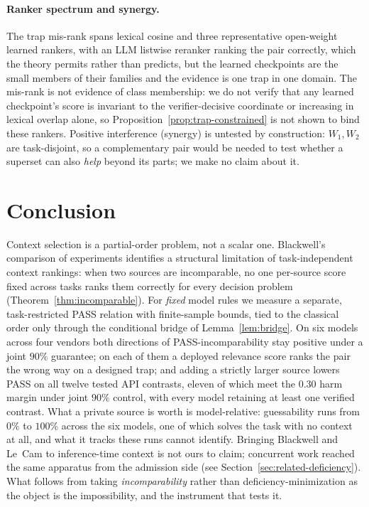 \documentclass[11pt]{article}
\theoremstyle{plain}
\theoremstyle{definition}
\theoremstyle{remark}
\begin{document}
\paragraph{Ranker spectrum and synergy.} The trap mis-rank spans lexical cosine and three
representative open-weight learned rankers, with an LLM listwise reranker ranking the pair
correctly, which the theory permits rather than predicts, but the
learned checkpoints are the small members of their families and the evidence is one trap in one
domain. The mis-rank is not evidence of class membership: we do not verify that any learned
checkpoint's score is invariant to the verifier-decisive coordinate or increasing in lexical
overlap alone, so Proposition~\ref{prop:trap-constrained} is not shown to bind these
rankers. Positive
interference (synergy) is untested by construction: $W_1, W_2$ are
task-disjoint, so a complementary pair would be needed to test whether a superset can also
\emph{help} beyond its parts; we make no claim about it.

\section{Conclusion}
\label{sec:conclusion}

Context selection is a partial-order problem, not a scalar one. Blackwell's comparison of
experiments identifies a structural limitation of task-independent context rankings: when two
sources are incomparable, no one per-source score fixed across tasks ranks them correctly for every
decision problem (Theorem~\ref{thm:incomparable}). For \emph{fixed} model rules we measure a
separate, task-restricted PASS relation with finite-sample bounds, tied to the classical order only
through the conditional bridge of Lemma~\ref{lem:bridge}. On six models across four vendors both
directions of PASS-incomparability stay positive under a joint $90\%$ guarantee; on each of them a
deployed relevance score ranks the pair the wrong way on a designed trap; and adding a strictly
larger source lowers PASS on all twelve tested API contrasts, eleven of which meet the $0.30$ harm
margin under joint $90\%$ control, with every model retaining at least one verified contrast. What a private source is worth is model-relative: guessability runs from
$0\%$ to $100\%$ across the six models, one of which solves the task with no context at all, and
what it tracks these runs cannot identify. Bringing Blackwell and Le~Cam to inference-time context is not ours to claim; concurrent
work reached the same apparatus from the admission side (see Section~\ref{sec:related-deficiency}). What
follows from taking \emph{incomparability} rather than deficiency-minimization as the object is the
impossibility, and the instrument that tests it.
\end{document}
